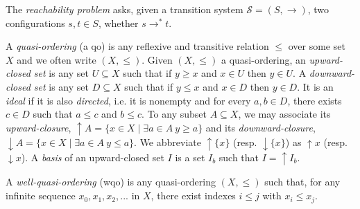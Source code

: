 The {\em reachability problem} asks, given a transition system $\mathscr{S} = (S, \to)$, two configurations $s, t \in S$, whether $s \to^* t$. %


%

\noindent
A {\em quasi-ordering} (a qo) is any reflexive and transitive relation $\leq$ over some set $X$ and we often write $(X,\leq)$. 
%
Given $(X,\leq)$ a quasi-ordering, an {\em upward-closed set} is any set $U \subseteq X$ such that if $y \geq x$ and $x \in U$ then $y \in U $.
A {\em downward-closed set} is any set $D \subseteq X$ such that if $y \leq x$ and $x \in D$ then $y \in D $. 
It is an {\em ideal } if it is also {\em directed}, i.e. it is nonempty and for every $a,b \in D$, there exists $c \in D$ such that $a \leq c$ and $b \leq c$.
To any subset $A \subseteq X$, we may associate
its {\em upward-closure},
 $\uparrow A = \{x \in X \mid \exists a \in A ~ y \geq a\}$
 and its 
 {\em downward-closure},
 $\downarrow A = \{x \in X \mid \exists a \in A ~ y \leq a\}$. 
We abbreviate $\uparrow \{x\}$ (resp. $\downarrow \{x\}$)
as $\uparrow x$ (resp. $\downarrow x$).
%
A {\em basis} of an upward-closed set $I$ is a set $I_b$ such that $I = \uparrow I_b$. 

\begin{definition}
 A {\em well-quasi-ordering} (wqo) is any quasi-ordering $(X,\leq)$ such that, for any infinite sequence $x_0, x_1, x_2, ...$ in $X$, there exist indexes $i \leq j$ with $x_i \leq  x_j$.
\end{definition}
%
%
\iffalse
%
\begin{lemma}
(Erd\"os and Rado). Assume $\leq$ is a wqo. Then any infinite sequence contains an infinite increasing subsequence: $x_{i_0} \leq x_{i_1} \leq x_{i_2} \cdots$ (with $i_0 < i_1 < i_2 \cdots$).
\end{lemma}


\begin{proof}
Consider an infinite sequence and the set $M = \{i \in N \mid \forall j > i ~ x_i \not\leq x_j \}$. $M$ cannot
be infinite, otherwise it would lead to an infinite subsequence contradicting the wqo
hypothesis. Thus, $M$ is bounded and any $x_i$ with $i$ beyond $M$ can start an infinite
increasing subsequence.
\end{proof}
%
\fi
%


